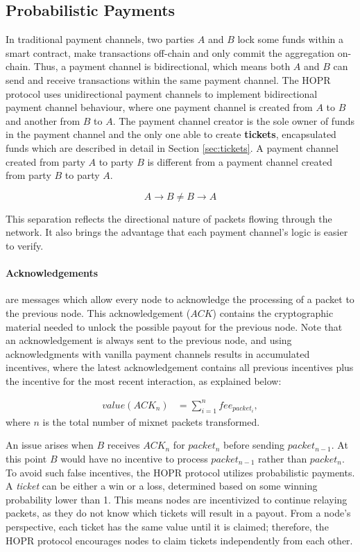 \subsection{Probabilistic Payments}
\label{sec:incentives:probabilistic}

In traditional payment channels, two parties $A$ and $B$ lock some funds within a smart contract, make transactions off-chain and only commit the aggregation on-chain. Thus, a payment channel is bidirectional, which means both $A$ and $B$ can send and receive transactions within the same payment channel. The HOPR protocol uses unidirectional payment channels to implement bidirectional payment channel behaviour, where one payment channel is created from $A$ to $B$ and another from $B$ to $A$. The payment channel creator is the sole owner of funds in the payment channel and the only one able to create \textbf{tickets}, encapsulated funds which are described in detail in Section \ref{sec:tickets}. A payment channel created from party $A$ to party $B$ is different from a payment channel created from party $B$ to party $A$.

$$A\rightarrow B \neq B\rightarrow A$$

This separation reflects the directional nature of packets flowing through the network. It also brings the advantage that each payment channel's logic is easier to verify.

\paragraph{Acknowledgements} are messages which allow every node to acknowledge the processing of a packet to the previous node. This acknowledgement ($ACK$) contains the cryptographic material needed to unlock the possible payout for the previous node. Note that an acknowledgement is always sent to the previous node, and using acknowledgments with vanilla payment channels results in accumulated incentives, where the latest acknowledgement contains all previous incentives plus the incentive for the most recent interaction, as explained below:

\begin{align}
    value (ACK_n) & =\sum_{i=1}^nfee_{packet_i},
\end{align}
where $n$ is the total number of mixnet packets transformed.

An issue arises when $B$ receives $ACK_n$ for $packet_n$ before sending $packet_{n-1}$. At this point $B$ would have no incentive to process $packet_{n-1}$ rather than $packet_{n}$. To avoid such false incentives, the HOPR protocol utilizes probabilistic payments. A \textit{ticket} can be either a win or a loss, determined based on some winning probability lower than 1. This means nodes are incentivized to continue relaying packets, as they do not know which tickets will result in a payout. From a node's perspective, each ticket has the same value until it is claimed; therefore, the HOPR protocol encourages nodes to claim tickets independently from each other.

